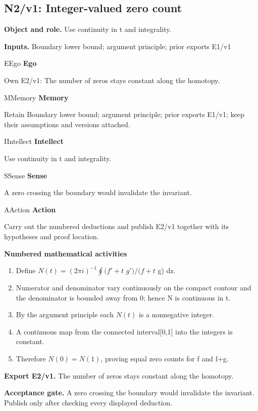 \documentclass[preprint,12pt,aps,pra,showkeys,amsmath,amssymb,superscriptaddress,floatfix]{revtex4-2}
\theoremstyle{definition}
\theoremstyle{remark}
\newcommand{\mmfaculty}[3]{%
 \begin{mmfacultybox}{#1}{#2}
 {\sffamily\bfseries\color{MMBlue}#2}\par\smallskip #3
 \end{mmfacultybox}}
\newcommand{\field}[2]{\par\smallskip\noindent\textbf{#1.} #2\par}
\begin{document}
\clearpage

\subsection{N2/v1: Integer-valued zero count}

\field{Object and role}{Use continuity in t and integrality.}

\field{Inputs}{Boundary lower bound; argument principle; prior exports E1/v1}

\mmfaculty{E}{Ego}{Own E2/v1: The number of zeros stays constant along the homotopy.}

\mmfaculty{M}{Memory}{Retain Boundary lower bound; argument principle; prior exports E1/v1;
keep their assumptions and versions attached.}

\mmfaculty{I}{Intellect}{Use continuity in t and integrality.}

\mmfaculty{S}{Sense}{A zero crossing the boundary would invalidate the invariant.}

\mmfaculty{A}{Action}{Carry out the numbered deductions and publish E2/v1 together with its
hypotheses and proof location.}

\smallskip\noindent\textbf{Numbered mathematical activities}

\begin{enumerate}[label=N2.\arabic*,leftmargin=3.4em]

\item Define \(N(t)=(2\pi i)^{-1}\oint (f'+t\) \(g')/(f+t\) g) dz.

\item Numerator and denominator vary continuously on the compact contour and
the denominator is bounded away from 0; hence N is continuous in t.

\item By the argument principle each \(N(t)\) is a nonnegative integer.

\item A continuous map from the connected interval{[}0,1{]} into the integers
is constant.

\item Therefore \(N(0)=N(1)\), proving equal zero counts for f and f+g.

\end{enumerate}

\field{Export E2/v1}{The number of zeros stays constant along the homotopy.}

\field{Acceptance gate}{A zero crossing the boundary would invalidate the invariant. Publish
only after checking every displayed deduction.}
\end{document}
